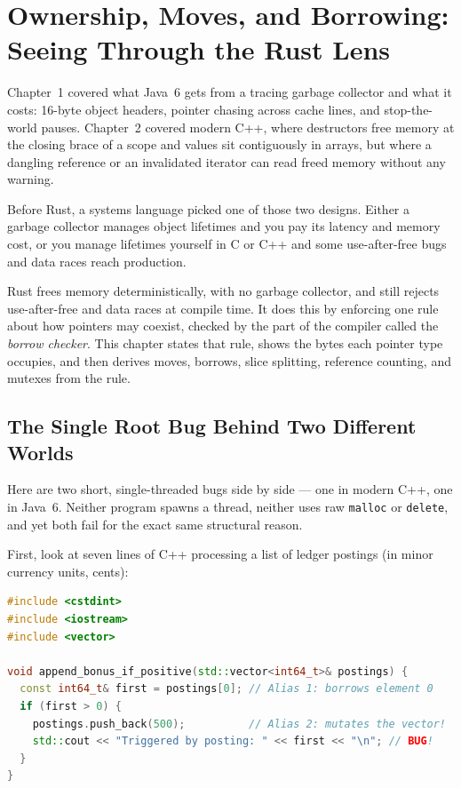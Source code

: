 \chapter{Ownership, Moves, and Borrowing: Seeing Through the Rust Lens}

Chapter~1 covered what Java~6 gets from a tracing garbage collector and what it costs: 16-byte object headers, pointer chasing across cache lines, and stop-the-world pauses. Chapter~2 covered modern C++, where destructors free memory at the closing brace of a scope and values sit contiguously in arrays, but where a dangling reference or an invalidated iterator can read freed memory without any warning.

Before Rust, a systems language picked one of those two designs. Either a garbage collector manages object lifetimes and you pay its latency and memory cost, or you manage lifetimes yourself in C or C++ and some use-after-free bugs and data races reach production.

Rust frees memory deterministically, with no garbage collector, and still rejects use-after-free and data races at compile time. It does this by enforcing one rule about how pointers may coexist, checked by the part of the compiler called the \emph{borrow checker}. This chapter states that rule, shows the bytes each pointer type occupies, and then derives moves, borrows, slice splitting, reference counting, and mutexes from the rule.

\chapterline

\section{The Single Root Bug Behind Two Different Worlds}
\label{ch03:aliasing-xor-mutability}

Here are two short, single-threaded bugs side by side --- one in modern C++, one in Java~6. Neither program spawns a thread, neither uses raw \texttt{malloc} or \texttt{delete}, and yet both fail for the exact same structural reason.

First, look at seven lines of C++ processing a list of ledger postings (in minor currency units, cents):

\begin{lstlisting}[language=C++]
#include <cstdint>
#include <iostream>
#include <vector>

void append_bonus_if_positive(std::vector<int64_t>& postings) {
  const int64_t& first = postings[0]; // Alias 1: borrows element 0
  if (first > 0) {
    postings.push_back(500);          // Alias 2: mutates the vector!
    std::cout << "Triggered by posting: " << first << "\n"; // BUG!
  }
}
\end{lstlisting}

